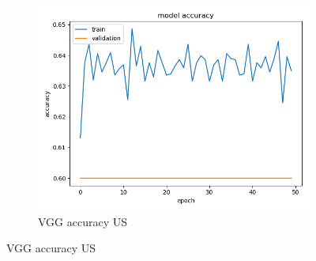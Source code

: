 \begin{figure}[h!]
\begin{subfigure}[b]{.3\linewidth}
\includegraphics[width=\linewidth]{Figs/vgg_us_acc.jpg}
\caption{VGG accuracy US}
\end{subfigure}


\end{figure}

